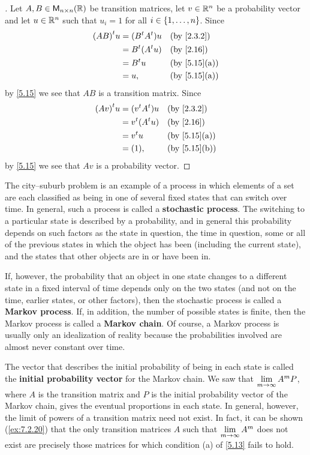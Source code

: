 \begin{proof}[]
  Let \(A, B \in \ms[n][n][\R]\) be transition matrices, let \(v \in \mathbb{R}^n\) be a probability vector and let \(u \in \mathbb{R}^n\) such that \(u_i = 1\) for all \(i \in \left\lbrace1, \dots, n\right\rbrace\).
  Since
  \begin{align*}
    \tp{(AB)} u & = (\tp{B} \tp{A}) u &  & \by{2.3.2}   \\
                & = \tp{B} (\tp{A} u) &  & \by{2.16}    \\
                & = \tp{B} u          &  & \by{5.15}[a] \\
                & = u,                &  & \by{5.15}[a]
  \end{align*}
  by \cref{5.15} we see that \(AB\) is a transition matrix.
  Since
  \begin{align*}
    \tp{(Av)} u & = (\tp{v} \tp{A}) u &  & \by{2.3.2}   \\
                & = \tp{v} (\tp{A} u) &  & \by{2.16}    \\
                & = \tp{v} u          &  & \by{5.15}[a] \\
                & = (1),              &  & \by{5.15}[b]
  \end{align*}
  by \cref{5.15} we see that \(Av\) is a probability vector.
\end{proof}

\begin{defn}\label{5.3.6}
  The city--suburb problem is an example of a process in which elements of a set are each classified as being in one of several fixed states that can switch over time.
  In general, such a process is called a \textbf{stochastic process}.
  The switching to a particular state is described by a probability, and in general this probability depends on such factors as the state in question, the time in question, some or all of the previous states in which the object has been (including the current state), and the states that other objects are in or have been in.

  If, however, the probability that an object in one state changes to a different state in a fixed interval of time depends only on the two states (and not on the time, earlier states, or other factors), then the stochastic process is called a \textbf{Markov process}.
  If, in addition, the number of possible states is finite, then the Markov process is called a \textbf{Markov chain}.
  Of course, a Markov process is usually only an idealization of reality because the probabilities involved are almost never constant over time.

  The vector that describes the initial probability of being in each state is called the \textbf{initial probability vector} for the Markov chain.
  We saw that \(\lim\limits_{m \to \infty} A^m P\), where \(A\) is the transition matrix and \(P\) is the initial probability vector of the Markov chain, gives the eventual proportions in each state.
  In general, however, the limit of powers of a transition matrix need not exist.
  In fact, it can be shown (\cref{ex:7.2.20}) that the only transition matrices \(A\) such that \(\lim\limits_{m \to \infty} A^m\) does not exist are precisely those matrices for which condition (a) of \cref{5.13} fails to hold.
\end{defn}

